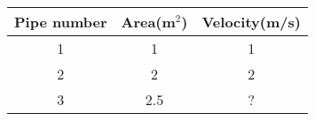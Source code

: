 \begin{tabular}[12pt]{|c| c| c|}
\hline
{Pipe number} & {Area(m$^2$)} & {Velocity(m/s)} \\
\hline 
   1  & 1 & 1 \\ \hline
   2  & 2 & 2\\ \hline
   3 & 2.5 & ? \\ \hline
   \end{tabular} \\